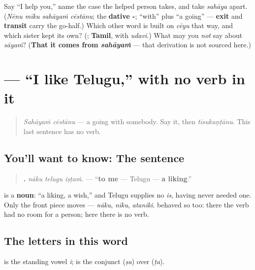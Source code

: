 \begin{tcolorbox}[breakable,colback=teal!4,colframe=teal!35!black,title={Before you move on}]
Say \textquotedblleft{}I help you,\textquotedblright{} name the case the helped person takes, and take \emph{sahāya} apart. (\emph{Nēnu mīku sahāyaṁ cēstānu}; the \textbf{dative -}; \emph{\textbf{}} \textquotedblleft{}with\textquotedblright{} plus \emph{\textbf{}} \textquotedblleft{}a going\textquotedblright{} — \textbf{exit} and \textbf{transit} carry the go-half.) Which other word is built on \emph{cēyu} that way, and which sister kept its own? (\emph{\textbf{}}; \textbf{Tamil}, with \emph{udavi}.) What may you \emph{not} say about \emph{sāyaṁ}? (\textbf{That it comes from \emph{sahāyaṁ}} — that derivation is not sourced here.)
\end{tcolorbox}
\section[\texorpdfstring{\te{నాకు} \te{తెలుగు} \te{ఇష్టం} (nāku telugu iṣṭaṁ)}{నాకు తెలుగు ఇష్టం (nāku telugu iṣṭaṁ)}]{   — \textquotedblleft{}I like Telugu,\textquotedblright{} with no verb in it}

\label{lesson:TE-C34-ishtam}



\begin{quote}
\emph{Sahāyaṁ cēstānu} — a going with somebody. Say it, then \emph{tīsukuṇṭānu}. This last sentence has no verb.
\end{quote}

\subsection*{You'll want to know: The sentence}
\begin{quote}
\textbf{  .} \emph{nāku telugu iṣṭaṁ.} — \textquotedblleft{}\textbf{to me} — Telugu — \textbf{a liking}.\textquotedblright{}
\end{quote}

\textbf{} is a \textbf{noun}: \textquotedblleft{}a liking, a wish,\textquotedblright{} and Telugu supplies no \emph{is}, having never needed one. Only the front piece moves — \emph{nāku}, \emph{nīku}, \emph{ataniki}. \textbf{} behaved so too: there the verb had no room for a person; here there is no verb.

\subsection*{The letters in this word}
\textbf{} is the standing vowel \emph{i}; \textbf{} is the conjunct \textbf{} (\emph{ṣa}) over \textbf{} (\emph{ṭa}).

